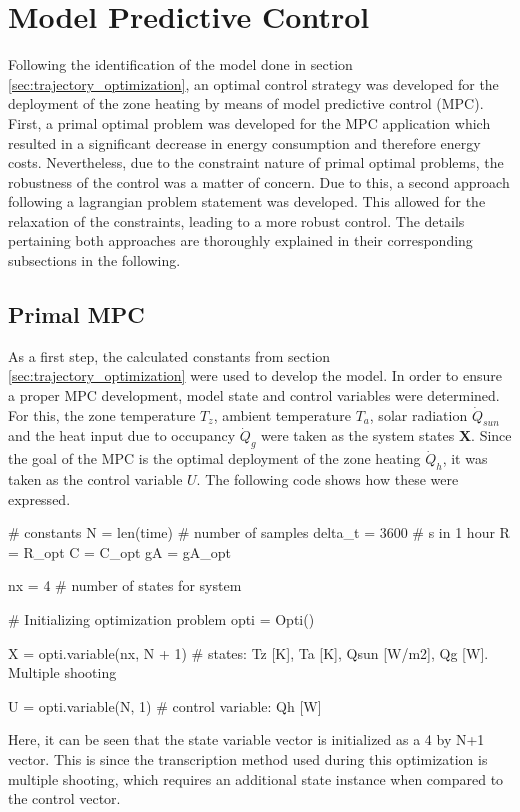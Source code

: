 \section{Model Predictive Control}
\label{sec:mpc}
Following the identification of the model done in section \ref{sec:trajectory_optimization}, an optimal control strategy was developed for the deployment of the zone heating by means of model predictive control (MPC). First, a primal optimal problem was developed for the MPC application which resulted in a significant decrease in energy consumption and therefore energy costs. Nevertheless, due to the constraint nature of primal optimal problems, the robustness of the control was a matter of concern. Due to this, a second approach following a lagrangian problem statement was developed. This allowed for the relaxation of the constraints, leading to a more robust control. The details pertaining both approaches are thoroughly explained in their corresponding subsections in the following.

\subsection{Primal MPC}
\label{subsec:primal_mpc}
As a first step, the calculated constants from section \ref{sec:trajectory_optimization} were used to develop the model. In order to ensure a proper MPC development, model state and control variables were determined. For this, the zone temperature $T_z$, ambient temperature $T_a$, solar radiation $\dot{Q}_{sun}$ and the heat input due to occupancy $\dot{Q}_g$ were taken as the system states $\boldsymbol{X}$. Since the goal of the MPC is the optimal deployment of the zone heating $\dot{Q}_{h}$, it was taken as the control variable $U$. The following code shows how these were expressed.

\begin{python}
    # constants
    N = len(time)  # number of samples
    delta_t = 3600  # s in 1 hour
    R = R_opt
    C = C_opt
    gA = gA_opt

    nx = 4  # number of states for system

    # Initializing optimization problem
    opti = Opti()

    X = opti.variable(nx, N + 1)  # states: Tz [K], Ta [K], Qsun [W/m2], Qg [W]. Multiple shooting

    U = opti.variable(N, 1)  # control variable: Qh [W]
\end{python}

Here, it can be seen that the state variable vector is initialized as a 4 by N+1 vector. This is since the transcription method used during this optimization is multiple shooting, which requires an additional state instance when compared to the control vector.\\

